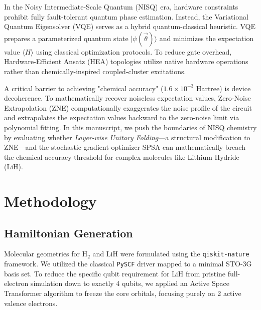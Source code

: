 \documentclass[aps,prx,reprint,superscriptaddress,nofootinbib,amsmath,amssymb]{revtex4-2}
\begin{document}
In the Noisy Intermediate-Scale Quantum (NISQ) era, hardware constraints prohibit fully fault-tolerant quantum phase estimation. Instead, the Variational Quantum Eigensolver (VQE) serves as a hybrid quantum-classical heuristic. VQE prepares a parameterized quantum state \(|\psi(\vec{\theta})\rangle\) and minimizes the expectation value \(\langle H \rangle\) using classical optimization protocols. To reduce gate overhead, Hardware-Efficient Ansatz (HEA) topologies utilize native hardware operations rather than chemically-inspired coupled-cluster excitations.

A critical barrier to achieving "chemical accuracy" (\(1.6 \times 10^{-3}\) Hartree) is device decoherence. To mathematically recover noiseless expectation values, Zero-Noise Extrapolation (ZNE) \cite{li2017efficient, giurgica2020digital} computationally exaggerates the noise profile of the circuit and extrapolates the expectation values backward to the zero-noise limit via polynomial fitting. In this manuscript, we push the boundaries of NISQ chemistry by evaluating whether \emph{Layer-wise Unitary Folding}---a structural modification to ZNE---and the stochastic gradient optimizer SPSA can mathematically breach the chemical accuracy threshold for complex molecules like Lithium Hydride (LiH).

\section{Methodology}

\subsection{Hamiltonian Generation}
Molecular geometries for \(\text{H}_2\) and LiH were formulated using the \texttt{qiskit-nature} framework. We utilized the classical \texttt{PySCF} driver mapped to a minimal STO-3G basis set. To reduce the specific qubit requirement for LiH from pristine full-electron simulation down to exactly 4 qubits, we applied an Active Space Transformer algorithm to freeze the core orbitals, focusing purely on 2 active valence electrons.
\end{document}
